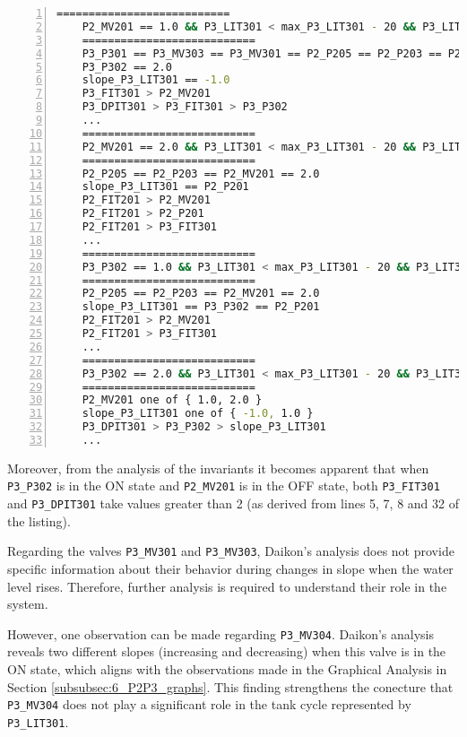 \begin{lstlisting}[language=bash, numbers=left, caption=Conditional Invariants for \texttt{P2\_MV201} and \texttt{P3\_P302}, label=lst:6_preproc_P2P3_conditional_invariants]
	===========================
	P2_MV201 == 1.0 && P3_LIT301 < max_P3_LIT301 - 20 && P3_LIT301 > min_P3_LIT301 + 24 
	===========================
	P3_P301 == P3_MV303 == P3_MV301 == P2_P205 == P2_P203 == P2_MV201 == 1.0
	P3_P302 == 2.0
	slope_P3_LIT301 == -1.0
	P3_FIT301 > P2_MV201
	P3_DPIT301 > P3_FIT301 > P3_P302
	...
	===========================
	P2_MV201 == 2.0 && P3_LIT301 < max_P3_LIT301 - 20 && P3_LIT301 > min_P3_LIT301 + 24 
	===========================
	P2_P205 == P2_P203 == P2_MV201 == 2.0
	slope_P3_LIT301 == P2_P201
	P2_FIT201 > P2_MV201
	P2_FIT201 > P2_P201
	P2_FIT201 > P3_FIT301
	...
	===========================
	P3_P302 == 1.0 && P3_LIT301 < max_P3_LIT301 - 20 && P3_LIT301 > min_P3_LIT301 + 24 
	===========================
	P2_P205 == P2_P203 == P2_MV201 == 2.0
	slope_P3_LIT301 == P3_P302 == P2_P201
	P2_FIT201 > P2_MV201
	P2_FIT201 > P3_FIT301
	...
	===========================
	P3_P302 == 2.0 && P3_LIT301 < max_P3_LIT301 - 20 && P3_LIT301 > min_P3_LIT301 + 24 
	===========================
	P2_MV201 one of { 1.0, 2.0 }
	slope_P3_LIT301 one of { -1.0, 1.0 }
	P3_DPIT301 > P3_P302 > slope_P3_LIT301
	...
\end{lstlisting}

Moreover, from the analysis of the invariants it becomes apparent that when \texttt{P3\_P302} is in the ON state and \texttt{P2\_MV201} is in the OFF state, both \texttt{P3\_FIT301} and \texttt{P3\_DPIT301} take values greater than 2 (as derived from lines 5, 7, 8 and 32 of the listing). 

\bigskip
Regarding the valves \texttt{P3\_MV301} and \texttt{P3\_MV303}, Daikon's analysis does not provide specific information about their behavior during changes in slope when the water level rises. Therefore, further analysis is required to understand their role in the system.

However, one observation can be made regarding \texttt{P3\_MV304}. Daikon's analysis reveals two different slopes (increasing and decreasing) when this valve is in the ON state, which aligns with the observations made in the Graphical Analysis in Section \ref{subsubsec:6_P2P3_graphs}. This finding strengthens the conecture that \texttt{P3\_MV304} does not play a significant role in the tank cycle represented by \texttt{P3\_LIT301}.


